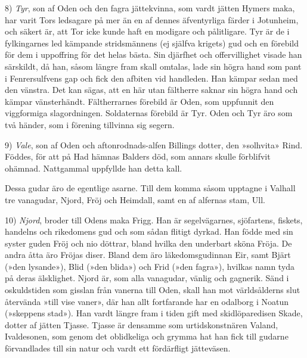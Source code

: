 8) \emph{Tyr}, son af Oden och den fagra jättekvinna, som vardt jätten
Hymers maka, har varit Tors ledsagare på mer än en af dennes
äfventyrliga färder i Jotunheim, och säkert är, att Tor icke kunde haft
en modigare och pålitligare. Tyr är de i fylkingarnes led kämpande
stridsmännens (ej själfva krigets) gud och en förebild för dem i
uppoffring för det helas bästa. Sin djärfhet och offervillighet visade
han särskildt, då han, såsom längre fram skall omtalas, lade sin högra
hand som pant i Fenrersulfvens gap och fick den afbiten vid handleden.
Han kämpar sedan med den vänstra. Det kan sägas, att en här utan
fältherre saknar sin högra hand och kämpar vänsterhändt. Fältherrarnes
förebild är
\protect\hypertarget{lb1625905.xhtmlux5cux23start31}{}{}\protect\hypertarget{lb1625905.xhtmlux5cux23start31-a}{}{}\protect\hypertarget{lb1625905.xhtmlux5cux23start31-b}{}{}\protect\hypertarget{lb1625905.xhtmlux5cux23start31-c}{}{}\protect\hypertarget{lb1625905.xhtmlux5cux23start31-d}{}{}
Oden, som uppfunnit den viggformiga slagordningen. Soldaternas förebild
är Tyr. Oden och Tyr äro som två händer, som i förening tillvinna sig
segern.

9) \emph{Vale}, son af Oden och aftonrodnads-alfen Billings dotter, den
»solhvita» Rind. Föddes, för att på Had hämnas Balders död, som annars
skulle förblifvit ohämnad. Nattgammal uppfyllde han detta kall.

Dessa gudar äro de egentlige asarne. Till dem komma såsom upptagne i
Valhall tre vanagudar, Njord, Fröj och Heimdall, samt en af alfernas
stam, Ull.

10) \emph{Njord}, broder till Odens maka Frigg. Han är segelvägarnes,
sjöfartens, fiskets, handelns och rikedomens gud och som sådan flitigt
dyrkad. Han födde med sin syster guden Fröj och nio döttrar, bland
hvilka den underbart sköna Fröja. De andra åtta äro Fröjas diser. Bland
dem äro läkedomsgudinnan Eir, samt Bjärt (»den lysande»), Blid (»den
blida») och Frid (»den fagra»), hvilkas namn tyda på deras älsklighet.
Njord är, som alla vanagudar, vänlig och gagnerik. Sänd i oskuldstiden
som gisslan från vanerna till Oden, skall han mot världsålderns slut
återvända »till vise vaner», där han allt fortfarande har en odalborg i
Noatun (»skeppens stad»). Han vardt längre fram i tiden gift med
skidlöparedisen Skade, dotter af jätten Tjasse. Tjasse är densamme som
urtidskonstnären Valand, Ivaldesonen, som genom det oblidkeliga och
grymma hat han fick till gudarne förvandlades till sin natur och vardt
ett fördärfligt jätteväsen.

